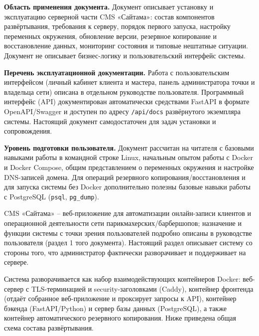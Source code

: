 \textbf{Область применения документа.} Документ описывает установку и
эксплуатацию серверной части CMS «Сайтама»: состав компонентов
развёртывания, требования к серверу, порядок первого запуска, настройку
переменных окружения, обновление версии, резервное копирование и
восстановление данных, мониторинг состояния и типовые нештатные ситуации.
Документ не описывает бизнес-логику и пользовательский интерфейс
системы.

\textbf{Перечень эксплуатационной документации.} Работа с
пользовательским интерфейсом (личный кабинет клиента и мастера, панель
администратора точки и владельца сети) описана в отдельном руководстве
пользователя. Программный интерфейс (API) документирован автоматически
средствами FastAPI в формате OpenAPI/Swagger и доступен по адресу
\texttt{/api/docs} развёрнутого экземпляра системы. Настоящий документ
самодостаточен для задач установки и сопровождения.

\textbf{Уровень подготовки пользователя.} Документ рассчитан на читателя
с базовыми навыками работы в командной строке Linux, начальным опытом
работы с Docker и Docker Compose, общим представлением о переменных
окружения и настройке DNS-записей домена. Для операций резервного
копирования/восстановления и для запуска системы без Docker
дополнительно полезны базовые навыки работы с PostgreSQL
(\texttt{psql}, \texttt{pg\_dump}).


CMS «Сайтама» -- веб-приложение для автоматизации онлайн-записи клиентов и
операционной деятельности сети парикмахерских/барбершопов; назначение и
функции системы с точки зрения пользователей подробно описаны в
руководстве пользователя (раздел 1 того документа). Настоящий раздел
описывает систему со стороны того, что администратор фактически
разворачивает и поддерживает на сервере.

Система разворачивается как набор взаимодействующих контейнеров Docker:
веб-сервер с TLS-терминацией и security-заголовками (Caddy), контейнер
фронтенда (отдаёт собранное веб-приложение и проксирует запросы к API),
контейнер бэкенда (FastAPI/Python) и сервер базы данных (PostgreSQL), а
также контейнер автоматического резервного копирования. Ниже приведена
общая схема состава развёртывания.

